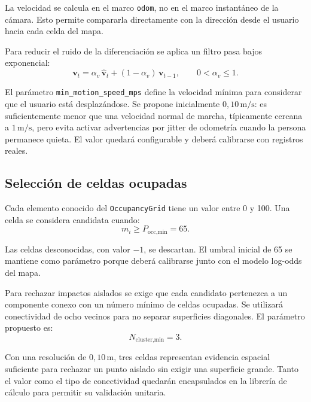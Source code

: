 La velocidad se calcula en el marco \texttt{odom}, no en el marco instantáneo
de la cámara. Esto permite compararla directamente con la dirección desde el
usuario hacia cada celda del mapa.

Para reducir el ruido de la diferenciación se aplica un filtro pasa bajos
exponencial:
%
\begin{equation}
  \label{eq:sa-velocity-filter}
  \mathbf{v}_t =
  \alpha_v\,\widehat{\mathbf{v}}_t
  +(1-\alpha_v)\,\mathbf{v}_{t-1},
  \qquad 0 < \alpha_v \leq 1.
\end{equation}

El parámetro \texttt{min\_motion\_speed\_mps} define la velocidad mínima para
considerar que el usuario está desplazándose. Se propone inicialmente
$0{,}10\,\text{m/s}$: es suficientemente menor que una velocidad normal de
marcha, típicamente cercana a $1\,\text{m/s}$, pero evita activar
advertencias por jitter de odometría cuando la persona permanece quieta. El
valor quedará configurable y deberá calibrarse con registros reales.

\subsection{Selección de celdas ocupadas}
\label{subsec:sa-occupied-cells}

Cada elemento conocido del \texttt{OccupancyGrid} tiene un valor entre 0 y
100. Una celda se considera candidata cuando:
%
\begin{equation}
  \label{eq:sa-occupancy-threshold}
  m_i \geq P_{\text{occ,min}} = 65.
\end{equation}

Las celdas desconocidas, con valor $-1$, se descartan. El umbral inicial de 65
se mantiene como parámetro porque deberá calibrarse junto con el modelo
log-odds del mapa.

Para rechazar impactos aislados se exige que cada candidato pertenezca a un
componente conexo con un número mínimo de celdas ocupadas. Se utilizará
conectividad de ocho vecinos para no separar superficies diagonales. El
parámetro propuesto es:
%
\begin{equation}
  N_{\text{cluster,min}} = 3.
\end{equation}

Con una resolución de $0{,}10\,\text{m}$, tres celdas representan evidencia
espacial suficiente para rechazar un punto aislado sin exigir una superficie
grande. Tanto el valor como el tipo de conectividad quedarán encapsulados en
la librería de cálculo para permitir su validación unitaria.

